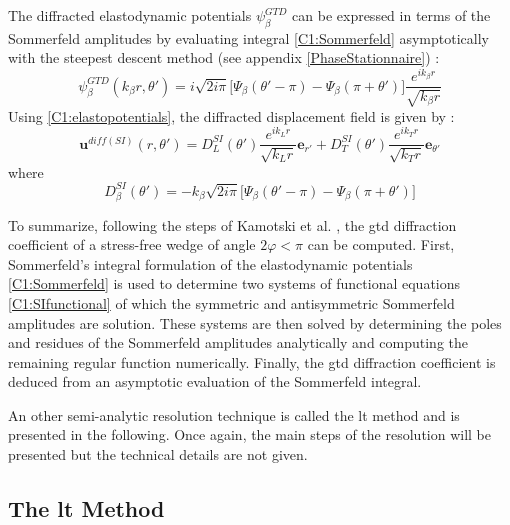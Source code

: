 The diffracted elastodynamic potentials $\psi_{\beta}^{GTD} $ can be expressed in terms of the Sommerfeld amplitudes by evaluating integral \eqref{C1:Sommerfeld} asymptotically with the steepest descent method (see appendix \ref{PhaseStationnaire}) :
\begin{equation}
\psi_{\beta}^{GTD}(k_{\beta} r,\theta')=i\sqrt{2i\pi}\lbrack \Psi_{\beta}(\theta'-\pi)-\Psi_{\beta}(\pi+\theta')\rbrack \dfrac{e^{ik_{\beta}r}}{\sqrt{k_{\beta}r}}
\end{equation}
Using \eqref{C1:elastopotentials}, the diffracted displacement field is given by :
\begin{equation}
\mathbf{u}^{diff(SI)}(r,\theta')=D_L^{SI}(\theta')\dfrac{e^{ik_Lr}}{\sqrt{k_Lr}}\mathbf{e}_{r'}+D_T^{SI}(\theta')\dfrac{e^{ik_Tr}}{\sqrt{k_Tr}}\mathbf{e}_{\theta'}
\end{equation}
where
\begin{equation}
D_{\beta}^{SI}(\theta')=-k_{\beta}\sqrt{2i\pi}\lbrack \Psi_{\beta}(\theta'-\pi)-\Psi_{\beta}(\pi+\theta')\rbrack
\end{equation}

To summarize, following the steps of Kamotski et al. \cite{KamotskiFradkin}, the \acrshort{gtd} diffraction coefficient of a stress-free wedge of angle $2\varphi<\pi$ can be computed. First, Sommerfeld's integral formulation of the elastodynamic potentials \eqref{C1:Sommerfeld} is used to determine two systems of functional equations \eqref{C1:SIfunctional} of which the symmetric and antisymmetric Sommerfeld amplitudes are solution. These systems are then solved by determining the poles and residues of the Sommerfeld amplitudes analytically and computing the remaining regular function numerically. Finally, the \acrshort{gtd} diffraction coefficient is deduced from an asymptotic evaluation of the Sommerfeld integral. 

An other semi-analytic resolution technique is called the \acrfull{lt} method and is presented in the following. Once again, the main steps of the resolution will be presented but the technical details are not given.

\subsection{The \acrfull{lt} Method}
\label{C1:lt}

